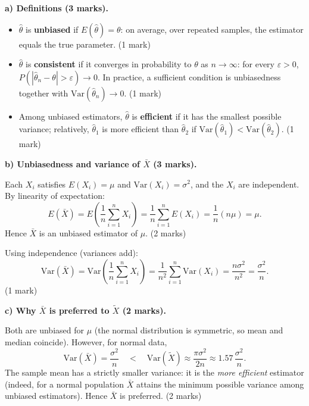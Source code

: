 \documentclass[11pt]{article}
\newcounter{popsec}
\newcounter{popsub}
\newcommand{\courssub}[1]{%
  \stepcounter{popsub}%
  \par\vspace{9pt}\noindent{\popxbold\fontsize{11.5}{13}\selectfont\color{popink}{\color{poporange}\thepopsec.\thepopsub}\hspace{6pt}#1}\par\nopagebreak\vspace{4pt}
}
\begin{document}
\courssub{I prepare for the GCE}

\begin{corrige}
\textbf{a) Definitions (3 marks).}
\begin{itemize}
\item $\hat{\theta}$ is \textbf{unbiased} if $E(\hat{\theta}) = \theta$: on average, over repeated samples, the estimator equals the true parameter. \hfill (1 mark)
\item $\hat{\theta}$ is \textbf{consistent} if it converges in probability to $\theta$ as $n \to \infty$: for every $\varepsilon > 0$, $P(|\hat{\theta}_n - \theta| > \varepsilon) \to 0$. In practice, a sufficient condition is unbiasedness together with $\mathrm{Var}(\hat{\theta}_n) \to 0$. \hfill (1 mark)
\item Among unbiased estimators, $\hat{\theta}$ is \textbf{efficient} if it has the smallest possible variance; relatively, $\hat{\theta}_1$ is more efficient than $\hat{\theta}_2$ if $\mathrm{Var}(\hat{\theta}_1) < \mathrm{Var}(\hat{\theta}_2)$. \hfill (1 mark)
\end{itemize}

\textbf{b) Unbiasedness and variance of $\bar{X}$ (3 marks).}

Each $X_i$ satisfies $E(X_i) = \mu$ and $\mathrm{Var}(X_i) = \sigma^2$, and the $X_i$ are independent. By linearity of expectation:
\[ E(\bar{X}) = E\left(\frac{1}{n}\sum_{i=1}^{n} X_i\right) = \frac{1}{n}\sum_{i=1}^{n} E(X_i) = \frac{1}{n}(n\mu) = \mu. \]
Hence $\bar{X}$ is an unbiased estimator of $\mu$. \hfill (2 marks)

Using independence (variances add):
\[ \mathrm{Var}(\bar{X}) = \mathrm{Var}\left(\frac{1}{n}\sum_{i=1}^{n} X_i\right) = \frac{1}{n^2}\sum_{i=1}^{n} \mathrm{Var}(X_i) = \frac{n\sigma^2}{n^2} = \frac{\sigma^2}{n}. \]
\hfill (1 mark)

\textbf{c) Why $\bar{X}$ is preferred to $\tilde{X}$ (2 marks).}

Both are unbiased for $\mu$ (the normal distribution is symmetric, so mean and median coincide). However, for normal data,
\[ \mathrm{Var}(\bar{X}) = \frac{\sigma^2}{n} \quad < \quad \mathrm{Var}(\tilde{X}) \approx \frac{\pi\sigma^2}{2n} \approx 1.57\,\frac{\sigma^2}{n}. \]
The sample mean has a strictly smaller variance: it is the \emph{more efficient} estimator (indeed, for a normal population $\bar{X}$ attains the minimum possible variance among unbiased estimators). Hence $\bar{X}$ is preferred. \hfill (2 marks)


\end{corrige}
\end{document}
